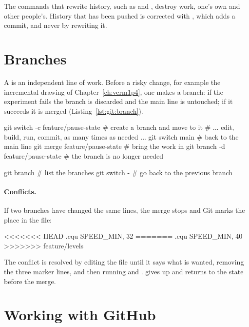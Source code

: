 \begin{prgwarn}
The commands that rewrite history, such as  and
, destroy work, one's own and other people's.
History that has been pushed is corrected with , which adds a
commit, and never by rewriting it.
\end{prgwarn}

\section{Branches}

A  is an independent line of work. Before a risky change, for
example the incremental drawing of Chapter~\ref{ch:verm1p4}, one makes a
branch: if the experiment fails the branch is discarded and the main line is
untouched; if it succeeds it is merged (Listing~\ref{lst:git:branch}).

\begin{shell}[caption={Working on a branch.},label=lst:git:branch]
git switch -c feature/pause-state   # create a branch and move to it
# ... edit, build, run, commit, as many times as needed ...
git switch main                     # back to the main line
git merge feature/pause-state       # bring the work in
git branch -d feature/pause-state   # the branch is no longer needed

git branch                          # list the branches
git switch -                        # go back to the previous branch
\end{shell}

\paragraph{Conflicts.} If two branches have changed the same lines, the merge
stops and Git marks the place in the file:
\begin{plain}
<<<<<<< HEAD
.equ SPEED_MIN, 32
=======
.equ SPEED_MIN, 40
>>>>>>> feature/levels
\end{plain}
The conflict is resolved by editing the file until it says what is wanted,
removing the three marker lines, and then running  and
.  gives up and returns to the
state before the merge.

\section{Working with GitHub}

